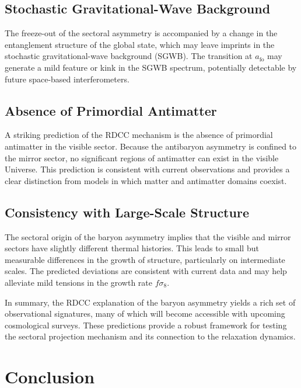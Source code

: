 \documentclass[11pt,a4paper]{article}
\begin{document}
\subsection{Stochastic Gravitational-Wave Background}

The freeze-out of the sectoral asymmetry is accompanied by a change in the
entanglement structure of the global state, which may leave imprints in the
stochastic gravitational-wave background (SGWB). The transition at
$a_{\mathrm{fo}}$ may generate a mild feature or kink in the SGWB spectrum,
potentially detectable by future space-based interferometers.

\subsection{Absence of Primordial Antimatter}

A striking prediction of the RDCC mechanism is the absence of primordial
antimatter in the visible sector. Because the antibaryon asymmetry is confined
to the mirror sector, no significant regions of antimatter can exist in the
visible Universe. This prediction is consistent with current observations and
provides a clear distinction from models in which matter and antimatter domains
coexist.

\subsection{Consistency with Large-Scale Structure}

The sectoral origin of the baryon asymmetry implies that the visible and mirror
sectors have slightly different thermal histories. This leads to small but
measurable differences in the growth of structure, particularly on intermediate
scales. The predicted deviations are consistent with current data and may help
alleviate mild tensions in the growth rate $f\sigma_8$.

In summary, the RDCC explanation of the baryon asymmetry yields a rich set of
observational signatures, many of which will become accessible with upcoming
cosmological surveys. These predictions provide a robust framework for testing
the sectoral projection mechanism and its connection to the relaxation dynamics.


\section{Conclusion}
\end{document}
